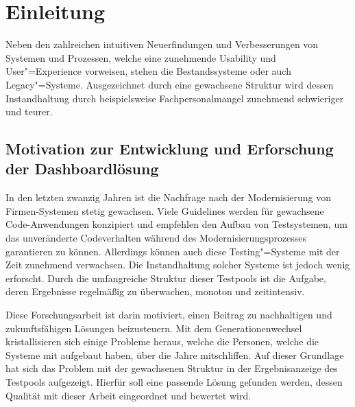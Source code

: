 \chapter{Einleitung} %
\label{ch:intro}

Neben den zahlreichen intuitiven Neuerfindungen und Verbesserungen von Systemen und Prozessen, welche eine zunehmende Usability und User"=Experience vorweisen, stehen die Bestandssysteme oder auch Legacy"=Systeme. Ausgezeichnet durch eine gewachsene Struktur wird dessen Instandhaltung durch beispielsweise Fachpersonalmangel zunehmend schwieriger und teurer.

\section{Motivation zur Entwicklung und Erforschung der Dashboardlösung} %
\label{sec:intro:Motivation}
In den letzten zwanzig Jahren ist die Nachfrage nach der Modernisierung von Firmen-Systemen stetig gewachsen. Viele Guidelines werden für gewachsene Code-Anwendungen konzipiert und empfehlen den Aufbau von Testsystemen, um das unveränderte Codeverhalten während des Modernisierungsprozesses garantieren zu können.
Allerdings können auch diese Testing"=Systeme mit der Zeit zunehmend verwachsen. Die Instandhaltung solcher Systeme ist jedoch wenig erforscht. Durch die umfangreiche Struktur dieser Testpools ist die Aufgabe, deren Ergebnisse regelmäßig zu überwachen, monoton und zeitintensiv.

Diese Forschungsarbeit ist darin motiviert, einen Beitrag zu nachhaltigen und zukunftsfähigen Lösungen beizusteuern. Mit dem Generationenwechsel kristallisieren sich einige Probleme heraus, welche die Personen, welche die Systeme mit aufgebaut haben, über die Jahre mitschliffen. Auf dieser Grundlage hat sich das Problem mit der gewachsenen Struktur in der Ergebnisanzeige des Testpools aufgezeigt. Hierfür soll eine passende Lösung gefunden werden, dessen Qualität mit dieser Arbeit eingeordnet und bewertet wird.


